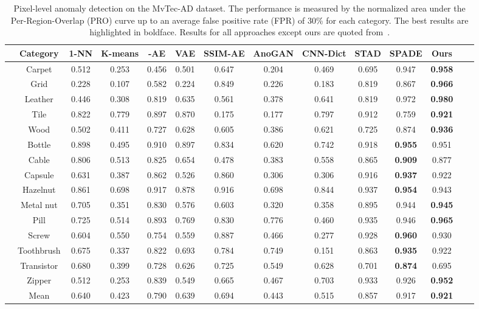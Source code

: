 \documentclass[final]{cvpr}
\begin{document}
{\begin{table*}[!t]
	\centering
	\caption{Pixel-level anomaly detection on the MvTec-AD dataset. The performance is measured by the normalized area under the Per-Region-Overlap (PRO) curve up to an average false positive rate (FPR) of 30\% for each category. The best results are highlighted in boldface. Results for all approaches except ours are quoted from~\cite{Bergmann2020}.}
	\label{tab3}
	\vspace{0.5em}
\begin{tabular}{c|c|c c c c c c c c c c c c}
			\hline
			& Category & 1-NN & K-means & -AE & VAE & SSIM-AE & AnoGAN & CNN-Dict & STAD & SPADE & Ours\\  \hline
			\multirow{5}{*}{\rotatebox{90}{Textures}} &
			Carpet       &  0.512 & 0.253 & 0.456 & 0.501 & 0.647 & 0.204 & 0.469 & 0.695 & 0.947 & \textbf{0.958} \\
			& Grid       &  0.228 & 0.107 & 0.582 & 0.224 & 0.849 & 0.226 & 0.183 & 0.819 & 0.867 & \textbf{0.966} \\
			& Leather    &  0.446 & 0.308 & 0.819 & 0.635 & 0.561 & 0.378 & 0.641 & 0.819 & 0.972 & \textbf{0.980} \\
			& Tile       &  0.822 & 0.779 & 0.897 & 0.870 & 0.175 & 0.177 & 0.797 & 0.912 & 0.759 &\textbf{0.921} \\
			& Wood       &  0.502 & 0.411 & 0.727 & 0.628 & 0.605 & 0.386 & 0.621 & 0.725 & 0.874 &\textbf{0.936} \\ \hline
			\multirow{10}{*}{\rotatebox{90}{Objects}}
			& Bottle     &  0.898 & 0.495 & 0.910 & 0.897 & 0.834 & 0.620 & 0.742 & 0.918 & \textbf{0.955} & 0.951 \\
			& Cable      &  0.806 & 0.513 & 0.825 & 0.654 & 0.478 & 0.383 & 0.558 & 0.865 & \textbf{0.909} & 0.877 \\
			& Capsule    &  0.631 & 0.387 & 0.862 & 0.526 & 0.860 & 0.306 & 0.306 & 0.916 & \textbf{0.937} & 0.922\\
			& Hazelnut   &  0.861 & 0.698 & 0.917 & 0.878 & 0.916 & 0.698 & 0.844 & 0.937 & \textbf{0.954} & 0.943 \\
			& Metal nut  &  0.705 & 0.351 & 0.830 & 0.576 & 0.603 & 0.320 & 0.358 & 0.895 & 0.944 &\textbf{0.945} \\
			& Pill       &  0.725 & 0.514 & 0.893 & 0.769 & 0.830 & 0.776 & 0.460 & 0.935 & 0.946 &\textbf{0.965} \\
			& Screw      &  0.604 & 0.550 & 0.754 & 0.559 & 0.887 & 0.466 & 0.277 & 0.928 & \textbf{0.960} & 0.930 \\
			& Toothbrush &  0.675 & 0.337 & 0.822 & 0.693 & 0.784 & 0.749 & 0.151 & 0.863 & \textbf{0.935} & 0.922\\
			& Transistor &  0.680 & 0.399 & 0.728 & 0.626 & 0.725 & 0.549 & 0.628 & 0.701 & \textbf{0.874} & 0.695 \\
			& Zipper     &  0.512 & 0.253 & 0.839 & 0.549 & 0.665 & 0.467 & 0.703 & 0.933 & 0.926 &\textbf{0.952} \\ \hline \hline
			& Mean       &  0.640 & 0.423 & 0.790 & 0.639 & 0.694 & 0.443 & 0.515 & 0.857 & 0.917 & \textbf{0.921} \\
			\hline
		\end{tabular}
\end{table*}

}
\end{document}
